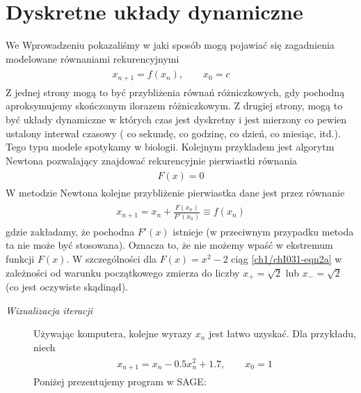 \documentclass[a4paper,12pt,polish]{sphinxmanual}
\begin{document}
\section{Dyskretne układy dynamiczne}
\label{ch1/chI031:dyskretne-uklady-dynamiczne}\label{ch1/chI031::doc}
We Wprowadzeniu pokazaliśmy w jaki sposób mogą pojawiać się zagadnienia modelowane równaniami rekurencyjnymi
\label{ch1/chI031:equation-eqn1}\begin{gather}
\begin{split}x_{n+1} = f(x_n), \quad \quad x_0 = c\qquad\end{split}\label{ch1/chI031-eqn1}
\end{gather}
Z jednej strony mogą to być przybliżenia  równań różniczkowych, gdy pochodną aproksymujemy  skończonym ilorazem różniczkowym. Z drugiej strony, mogą to być układy dynamiczne w których czas jest  dyskretny i jest mierzony co pewien ustalony interwał czasowy ( co sekundę, co godzinę, co dzień, co miesiąc, itd.). Tego typu modele spotykamy w biologii. Kolejnym przykladem jest algorytm Newtona pozwalający znajdować rekurencyjnie  pierwiastki równania
\label{ch1/chI031:equation-eqn2}\begin{gather}
\begin{split}F(x) = 0\end{split}\label{ch1/chI031-eqn2}
\end{gather}
W metodzie  Newtona  kolejne przybliżenie pierwiastka dane jest przez równanie
\label{ch1/chI031:equation-eqn2a}\begin{gather}
\begin{split}x_{n+1} = x_n + \frac{F(x_n)}{F'(x_n)}\equiv f(x_n)\end{split}\label{ch1/chI031-eqn2a}
\end{gather}
gdzie zakładamy, że pochodna $F'(x)$ istnieje (w przeciwnym przypadku metoda ta nie może być stosowana). Oznacza to, że nie możemy wpaść w ekstremum funkcji $F(x)$.  W szczególności dla $F(x)=x^2-2$ ciąg \eqref{ch1/chI031-eqn2a} w zależności od warunku początkowego zmierza do liczby $x_{+}=\sqrt{2}$ lub $x_{-}=\sqrt{2}$  (co jest oczywiste skądinąd).
\begin{description}
\item[{\emph{Wizualizacja iteracji}}] \leavevmode
Używając komputera, kolejne wyrazy $x_n$ jest łatwo uzyskać. Dla przykładu, niech
\label{ch1/chI031:equation-eqn3}\begin{gather}
\begin{split}x_{n+1} = x_n - 0.5  x_{n}^2 +1.7, \qquad x_0 = 1\end{split}\label{ch1/chI031-eqn3}
\end{gather}
Poniżej prezentujemy program w SAGE:

\end{description}
\end{document}

